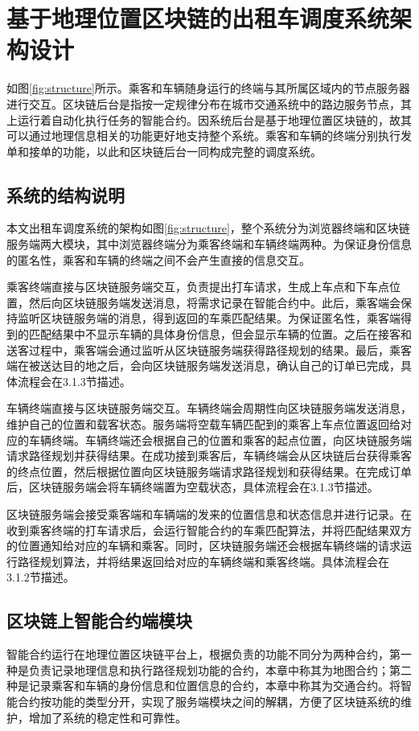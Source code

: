 \section{基于地理位置区块链的出租车调度系统架构设计}
如图\ref{fig:structure}所示。乘客和车辆随身运行的终端与其所属区域内的节点服务器进行交互。区块链后台是指按一定规律分布在城市交通系统中的路边服务节点，其上运行着自动化执行任务的智能合约。因系统后台是基于地理位置区块链的，故其可以通过地理信息相关的功能更好地支持整个系统。乘客和车辆的终端分别执行发单和接单的功能，以此和区块链后台一同构成完整的调度系统。

\subsection{系统的结构说明}
本文出租车调度系统的架构如图\ref{fig:structure}，整个系统分为浏览器终端和区块链服务端两大模块，其中浏览器终端分为乘客终端和车辆终端两种。为保证身份信息的匿名性，乘客和车辆的终端之间不会产生直接的信息交互。

乘客终端直接与区块链服务端交互，负责提出打车请求，生成上车点和下车点位置，然后向区块链服务端发送消息，将需求记录在智能合约中。此后，乘客端会保持监听区块链服务端的消息，得到返回的车乘匹配结果。为保证匿名性，乘客端得到的匹配结果中不显示车辆的具体身份信息，但会显示车辆的位置。之后在接客和送客过程中，乘客端会通过监听从区块链服务端获得路径规划的结果。最后，乘客端在被送达目的地之后，会向区块链服务端发送消息，确认自己的订单已完成，具体流程会在3.1.3节描述。

车辆终端直接与区块链服务端交互。车辆终端会周期性向区块链服务端发送消息，维护自己的位置和载客状态。服务端将空载车辆匹配到的乘客上车点位置返回给对应的车辆终端。车辆终端还会根据自己的位置和乘客的起点位置，向区块链服务端请求路径规划并获得结果。在成功接到乘客后，车辆终端会从区块链后台获得乘客的终点位置，然后根据位置向区块链服务端请求路径规划和获得结果。在完成订单后，区块链服务端会将车辆终端置为空载状态，具体流程会在3.1.3节描述。

区块链服务端会接受乘客端和车辆端的发来的位置信息和状态信息并进行记录。在收到乘客终端的打车请求后，会运行智能合约的车乘匹配算法，并将匹配结果双方的位置通知给对应的车辆和乘客。同时，区块链服务端还会根据车辆终端的请求运行路径规划算法，并将结果返回给对应的车辆终端和乘客终端。具体流程会在3.1.2节描述。

\subsection{区块链上智能合约端模块}
智能合约运行在地理位置区块链平台上，根据负责的功能不同分为两种合约，第一种是负责记录地理信息和执行路径规划功能的合约，本章中称其为地图合约；第二种是记录乘客和车辆的身份信息和位置信息的合约，本章中称其为交通合约。将智能合约按功能的类型分开，实现了服务端模块之间的解耦，方便了区块链系统的维护，增加了系统的稳定性和可靠性。

